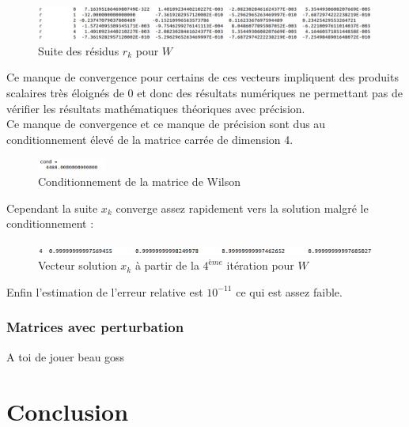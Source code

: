 \documentclass[12,french]{report}
\begin{document}
\begin{figure}[H]
	\centering
	\includegraphics[width=1\textwidth]{./Images/r_W}
	\caption{Suite des résidus $r_k$ pour $W$}
\end{figure}\vspace{0.2cm}

Ce manque de convergence pour certains de ces vecteurs impliquent des produits scalaires très éloignés de 0 et donc des résultats numériques ne permettant pas de vérifier les résultats mathématiques théoriques avec précision.\\

Ce manque de convergence et ce manque de précision sont dus au conditionnement élevé de la matrice carrée de dimension 4.\\

\begin{figure}[H]
	\centering
	\includegraphics[width=0.2\textwidth]{./Images/Conditionnement_W}
	\caption{Conditionnement de la matrice de Wilson}
\end{figure}\vspace{0.2cm}

Cependant la suite $x_k$ converge assez rapidement vers la solution malgré le conditionnement :\\

\begin{figure}[H]
	\centering
	\includegraphics[width=1\textwidth]{./Images/x_W}
	\caption{Vecteur solution $x_k$ à partir de la $4^{ème}$ itération pour $W$}
\end{figure}\vspace{0.2cm}

Enfin l'estimation de l'erreur relative est $10^{-11}$ ce qui est assez faible. 

\subsection{Matrices avec perturbation}

A toi de jouer beau goss 


\chapter*{Conclusion}
\end{document}

